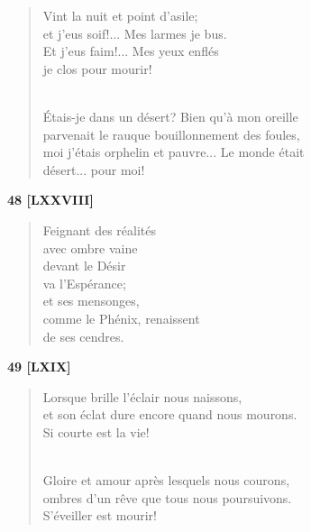 \documentclass[a4paper,12pt]{book}
\begin{document}
\begin{verse}
Vint la nuit et point d'asile; \\
et j'eus soif!... Mes larmes je bus. \\
Et j'eus faim!... Mes yeux enflés \\
je clos pour mourir! \\ \

Étais-je dans un désert? Bien qu'à mon oreille \\
parvenait le rauque bouillonnement des foules, \\
moi j'étais orphelin et pauvre... Le monde était \\
désert... pour moi! \\
\end{verse}

\bigskip

\begin{center} {\bf 48 [LXXVIII]} \end{center}

\begin{verse}
Feignant des réalités \\
avec ombre vaine \\
devant le Désir \\
va l'Espérance; \\
et ses mensonges, \\
comme le Phénix, renaissent \\
de ses cendres. \\
\end{verse}

\bigskip

\begin{center} {\bf 49 [LXIX]} \end{center}

\begin{verse}
Lorsque brille l'éclair nous naissons, \\
et son éclat dure encore quand nous mourons. \\
Si courte est la vie! \\ \

Gloire et amour après lesquels nous courons, \\
ombres d'un rêve que tous nous poursuivons. \\
S'éveiller est mourir! \\
\end{verse}
\end{document}
